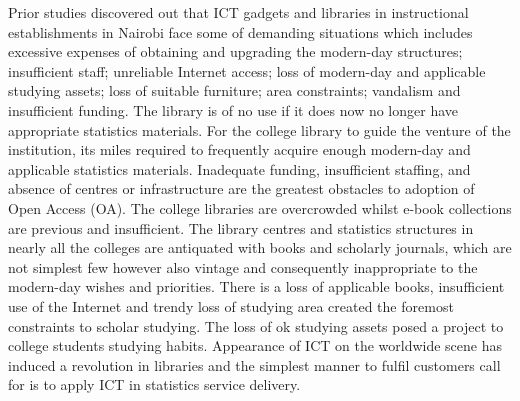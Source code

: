 Prior studies discovered out that ICT gadgets and libraries in instructional establishments in Nairobi face some of demanding situations which includes excessive expenses of obtaining and upgrading the modern-day structures; insufficient staff; unreliable Internet access; loss of modern-day and applicable studying assets; loss of suitable furniture; area constraints; vandalism and insufficient funding. The library is of no use if it does now no longer have appropriate statistics materials. For the college library to guide the venture of the institution, its miles required to frequently acquire enough modern-day and applicable statistics materials. Inadequate funding, insufficient staffing, and absence of centres or infrastructure are the greatest obstacles to adoption of Open Access (OA). The college libraries are overcrowded whilst e-book collections are previous and insufficient. The library centres and statistics structures in nearly all the colleges are antiquated with books and scholarly journals, which are not simplest few however also vintage and consequently inappropriate to the modern-day wishes and priorities. There is a loss of applicable books, insufficient use of the Internet and trendy loss of studying area created the foremost constraints to scholar studying. The loss of ok studying assets posed a project to college students studying habits. Appearance of ICT on the worldwide scene has induced a revolution in libraries and the simplest manner to fulfil customers call for is to apply ICT in statistics service delivery.
